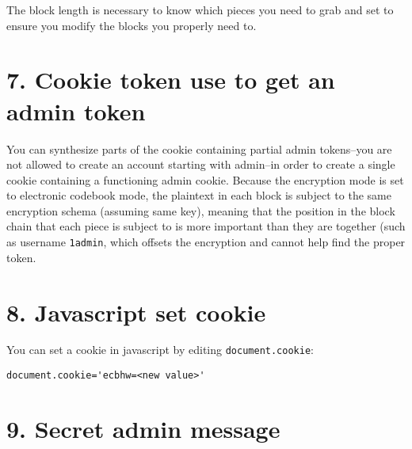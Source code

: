 \documentclass[12pt,letterpaper]{article}
\begin{document}
The block length is necessary to know which pieces you need to grab and
set to ensure you modify the blocks you properly need to.

\section*{7. Cookie token use to get an admin token}
You can synthesize parts of the cookie containing partial admin tokens--you are
not allowed to create an account starting with admin--in order to create a single
cookie containing a functioning admin cookie. Because the encryption mode is
set to electronic codebook mode, the plaintext in each block is subject to the
same encryption schema (assuming same key), meaning that the position in the block
chain that each piece is subject to is more important than they are together (such
as username \verb~1admin~, which offsets the encryption and cannot help find the
proper token.

\section*{8. Javascript set cookie}
You can set a cookie in javascript by editing \verb~document.cookie~:

\begin{verbatim}
document.cookie='ecbhw=<new value>'
\end{verbatim}

\section*{9. Secret admin message}
\end{document}
